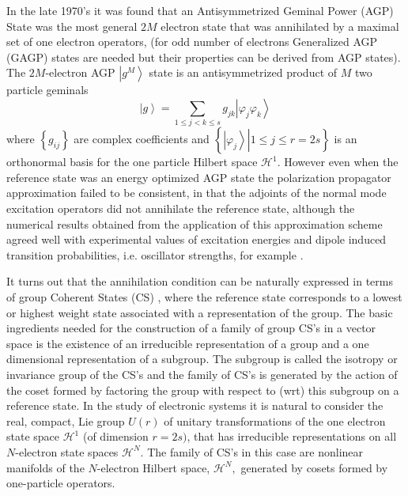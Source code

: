 \documentclass[aps,preprint]{revtex4}%
\begin{document}
In the late 1970's it was found \cite{Weiner80}\cite{Weiner80a}%
\cite{Goscinski80} \cite{Linderberg77}\cite{Ohrn79} that an Antisymmetrized
Geminal Power (AGP) \cite{Coleman63} State was the most general $2M$ electron
state that was annihilated by a maximal set of one electron operators, (for
odd number of electrons Generalized AGP (GAGP) states \cite{Coleman65} are
needed but their properties can be derived from AGP states). The $2M$-electron
AGP $\left\vert g^{M}\right\rangle $ state is an antisymmetrized product of
$M$ two particle geminals
\begin{equation}
\left\vert g\right\rangle =\sum_{1\leq j<k\leq s}g_{jk}\left\vert \varphi
_{j}\varphi_{k}\right\rangle
\end{equation}
where $\left\{  g_{ij}\right\}  $ are complex coefficients and $\left\{
\left.  \left\vert \varphi_{j}\right\rangle \right\vert 1\leq j\leq
r=2s\right\}  $ is an orthonormal basis for the one particle Hilbert space
$\mathcal{H}^{1}.$ However even when the reference state was an energy
optimized AGP state the polarization propagator approximation failed to be
consistent, in that the adjoints of the normal mode excitation operators did
not annihilate the reference state, although the numerical results obtained
from the application of this approximation scheme agreed well with
experimental values of excitation energies and dipole induced transition
probabilities, i.e. oscillator strengths, for example \cite{Sangfelt85}%
\cite{Sangfelt84}\cite{Elander83}\cite{Goscinski82}\cite{Weiner83}%
\cite{Sangfelt81} \cite{Weiner87}\cite{Sangfelt87}\cite{Ohrn85}\cite{Weiner85}%
\cite{Weiner84a}\cite{Jensen82}\cite{Jorgen83}.

It turns out that the annihilation condition can be naturally expressed in
terms of group Coherent States (CS) \cite{Perelomov_book}\cite{Klauder}%
\cite{Gilmore_book}, where the reference state corresponds to a lowest or
highest weight state associated with a representation of the group. The basic
ingredients needed for the construction of a family of group CS's in a vector
space is the existence of an irreducible representation of a group and a one
dimensional representation of a subgroup. The subgroup is called the isotropy
or invariance group of the CS's and the family of CS's is generated by the
action of the coset formed by factoring the group with respect to (wrt) this
subgroup on a reference state. In the study of electronic systems it is
natural to consider the real, compact, \cite{Encyclo} Lie group $U(r)$ of
unitary transformations of the one electron state space $\mathcal{H}^{1}$ (of
dimension $r=2s)$, that has irreducible representations on all $N$-electron
state spaces $\mathcal{H}^{N}$. The family of CS's in this case are nonlinear
manifolds of the $N$-electron Hilbert space, $\mathcal{H}^{N},$ generated by
cosets formed by one-particle operators.
\end{document}
